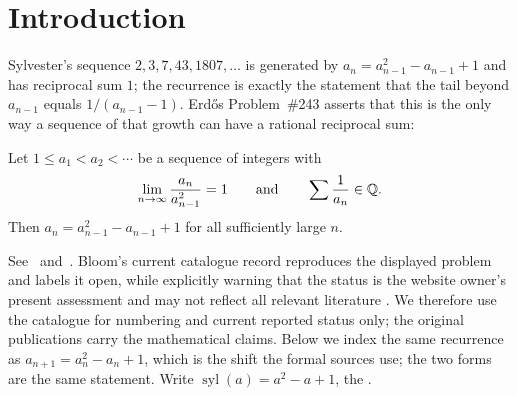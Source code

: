\documentclass[11pt]{article}
\newcommand{\sylnext}{\operatorname{syl}}
\begin{document}
\begin{abstract}
One clause of that frontier is already published and is credited as such.  That
a counterexample must have negative errors infinitely often is the
contrapositive of Koizumi's Proposition~19(2)~\cite[Prop.~19(2)]{koizumi2025},
which he attributes to Badea; Koizumi and Badea assume the sign is eventually
nonnegative.  The theorem proved here assumes only that the negative part is
eventually bounded, which admits sign changes of bounded depth at every scale,
so it is a strengthening of their hypothesis rather than a new clause.  The
unboundedness and divergent-mass parts of the frontier have no located
antecedent.

Koizumi's pseudo-greedy coordinates supply normalised vanishing and a stronger
centring range for the canonical Erd\H{o}s orbit, but neither boundedness nor
summability of its negative part.  Thus any surviving orbit must have
cofinally unbounded negative excursions and divergent normalised negative
mass.  Excluding that case is the exact open boundary, and Problem~\#243
remains open.
\end{abstract}

\section{Introduction}\label{sec:problem}

Sylvester's sequence $2,3,7,43,1807,\ldots$ is generated by
$a_{n}=a_{n-1}^{2}-a_{n-1}+1$ and has reciprocal sum $1$; the recurrence is
exactly the statement that the tail beyond $a_{n-1}$ equals $1/(a_{n-1}-1)$.
Erd\H{o}s Problem~\#243 asserts that this is the only way a sequence of that
growth can have a rational reciprocal sum:

\begin{problem}[Erd\H{o}s \#243]\label{res:problem}
Let $1\le a_1<a_2<\cdots$ be a sequence of integers with
\[
 \lim_{n\to\infty}\frac{a_n}{a_{n-1}^{2}}=1
 \qquad\text{and}\qquad
 \sum\frac{1}{a_n}\in\mathbb{Q} .
\]
Then $a_n=a_{n-1}^{2}-a_{n-1}+1$ for all sufficiently large $n$.
\end{problem}

\noindent See~\cite[p.~64]{erdosgraham1980} and~\cite[p.~105]{erdos1988}.
Bloom's current catalogue record reproduces the displayed problem and labels
it open, while explicitly warning that the status is the website owner's
present assessment and may not reflect all relevant literature
\cite{erdosproblems}.  We therefore use the catalogue for numbering and
current reported status only; the original publications carry the
mathematical claims.  Below we index the same recurrence as
$a_{n+1}=a_n^{2}-a_n+1$, which is the shift the formal sources use; the two
forms are the same statement.  Write $\sylnext(a)=a^{2}-a+1$, the
.
\end{document}
